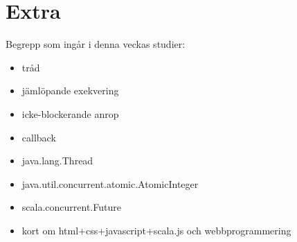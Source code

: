 \chapter{Extra}\label{chapter:W14}
Begrepp som ingår i denna veckas studier:
\begin{itemize}[noitemsep,label={$\square$},leftmargin=*]
\item tråd
\item jämlöpande exekvering
\item icke-blockerande anrop
\item callback
\item java.lang.Thread
\item java.util.concurrent.atomic.AtomicInteger
\item scala.concurrent.Future
\item kort om html+css+javascript+scala.js och webbprogrammering\end{itemize}
